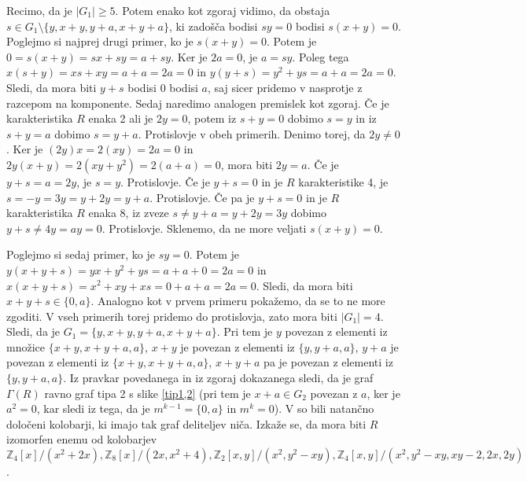 \documentclass[a4paper, 12pt]{amsart}
\theoremstyle{definition} %
\theoremstyle{plain} %
\newcommand{\Z}{\mathbb Z}
\begin{document}
Recimo, da je $|G_1| \ge 5$. Potem enako kot zgoraj vidimo, da obstaja $s\in G_1 \setminus \{y,x+y,y+a,x+y+a\}$, ki zadošča bodisi $sy = 0$ bodisi $s(x+y)=0$. Poglejmo si najprej drugi primer, ko je $s(x+y) = 0$. Potem je $0 = s(x+y) = sx + sy = a + sy$. Ker je $2a = 0$, je $a=sy$. Poleg tega $x(s+y) = xs +xy = a + a = 2a = 0$ in $y(y+s) = y^2 + ys = a + a = 2a = 0$. Sledi, da mora biti $y+s$ bodisi $0$ bodisi $a$, saj sicer pridemo v nasprotje z razcepom na komponente. Sedaj naredimo analogen premislek kot zgoraj. Če je karakteristika $R$ enaka 2 ali je $2y = 0$, potem iz $s+y=0$ dobimo $s=y$ in iz $s+y = a$ dobimo $s = y+a$. Protislovje v obeh primerih. Denimo torej, da $2y\neq 0$. Ker je $(2y)x = 2 (xy) = 2a=0$ in $2y(x+y) = 2(xy + y^2 ) = 2 (a+ a) = 0$, mora biti $2y = a$. Če je $y+s = a = 2y $, je $s = y$. Protislovje. Če je $y+s = 0$ in je $R$ karakteristike 4, je $s = -y = 3y = y +2y = y+a$. Protislovje. Če pa je $y+s = 0$ in je $R$ karakteristika $R$ enaka 8, iz zveze $s \neq y+a = y+ 2y = 3y$ dobimo $y+s \neq 4y = ay =0$. Protislovje. Sklenemo, da ne more veljati $s(x+y) = 0$.

Poglejmo si sedaj primer, ko je $sy = 0$. Potem je $y(x+y+s) = yx + y^2 + ys = a + a + 0= 2a = 0$ in $x(x+y+s) = x^2 + xy + xs = 0 + a + a = 2a = 0$. Sledi, da mora biti $x+y+s\in \{0,a\}$. Analogno kot v prvem primeru pokažemo, da se to ne more zgoditi. V vseh primerih torej pridemo do protislovja, zato mora biti $|G_1| = 4$. Sledi, da je $G_1 = \{y,x+y,y+a,x+y+a\}$. Pri tem je $y$ povezan z elementi iz množice $\{x+y,x+y+a,a\}$, $x+y$ je povezan z elementi iz $\{y,y+a,a\}$, $y+a$ je povezan z elementi iz $\{x+y,x+y+a,a\}$, $x+y+a$ pa je povezan z elementi iz $\{y,y+a,a\}$. Iz pravkar povedanega in iz zgoraj dokazanega sledi, da je graf $\Gamma(R)$ ravno graf tipa 2 s slike \ref{tip1,2} (pri tem je $x+a\in G_2$ povezan z $a$, ker je $a^2 = 0$, kar sledi iz tega, da je $m^{k-1}=\{0,a\}$ in $m^k=0$). V \cite{Redmond} so bili natančno določeni kolobarji, ki imajo tak graf deliteljev niča. Izkaže se, da mora biti $R$ izomorfen enemu od kolobarjev $\Z_4[x]/(x^2 + 2x), \Z_8[x]/(2x, x^2 + 4), \Z_2[x,y]/(x^2,y^2 - xy), \Z_4[x,y]/(x^2,y^2 - xy, xy-2,2x,2y)$.
\end{document}

